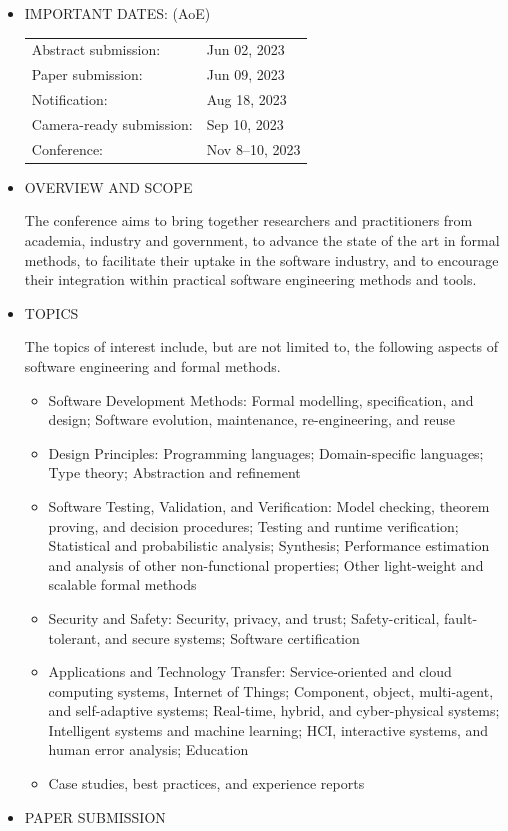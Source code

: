 \documentclass[prodmode,acmtecs]{acmsmall} %
\begin{document}
\begin{itemize}\item  IMPORTANT DATES: (AoE) 
 
\begin{tabulary}{\linewidth}{LL}Abstract submission:  & Jun 02, 2023 \\
Paper submission:  & Jun 09, 2023 \\
Notification:  & Aug 18, 2023 \\
Camera-ready submission:  & Sep 10, 2023 \\
Conference:  & Nov 8–10, 2023 \\
\end{tabulary}
 
\item  OVERVIEW AND SCOPE 
 
  The conference aims to bring together researchers and practitioners from academia, industry and government, to advance the state of the art in formal methods, to facilitate their uptake in the software industry, and to encourage their integration within practical software engineering methods and tools. 
 
\item  TOPICS  
 
  The topics of interest include, but are not limited to, the following aspects of software engineering and formal methods. 
 
\begin{itemize}\item  Software Development Methods: Formal modelling, specification, and design; Software evolution, maintenance, re-engineering, and reuse
\item  Design Principles: Programming languages; Domain-specific languages; Type theory; Abstraction and refinement
\item  Software Testing, Validation, and Verification: Model checking, theorem proving, and decision procedures; Testing and runtime verification; Statistical and probabilistic analysis; Synthesis; Performance estimation and analysis of other non-functional properties; Other light-weight and scalable formal methods
\item  Security and Safety: Security, privacy, and trust; Safety-critical, fault-tolerant, and secure systems; Software certification
\item  Applications and Technology Transfer: Service-oriented and cloud computing systems, Internet of Things; Component, object, multi-agent, and self-adaptive systems; Real-time, hybrid, and cyber-physical systems; Intelligent systems and machine learning; HCI, interactive systems, and human error analysis; Education
\item  Case studies, best practices, and experience reports
\end{itemize} 
\item  PAPER SUBMISSION 
 

\end{itemize}
\end{document}
